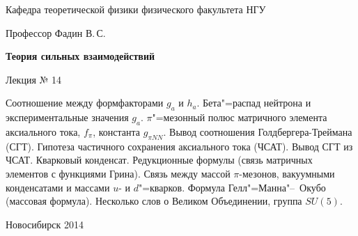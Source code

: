 \documentclass[12pt,pagesize,paper=192mm:108mm]{scrbook}
\begin{document}
\begin{titlepage}
\begin{center}
    Кафедра теоретической физики физического факультета НГУ
    \medskip

    \Large
    Профессор Фадин В.\,С.

    \huge
    \textbf{Теория сильных взаимодействий}
    \smallskip
    
    \Large
    Лекция № 14
    \vfill
    
    \normalsize
    \begin{minipage}{0.9\linewidth}
      Соотношение между формфакторами $g_a$ и $h_a$. Бета"=распад
      нейтрона и экспериментальные значения $g_a$. $\pi$"=мезонный
      полюс матричного элемента аксиального тока, $f_{\pi}$, константа
      $g_{\pi NN}$. Вывод соотношения Голдбергера-Треймана (СГТ). Гипотеза
      частичного сохранения аксиального тока (ЧСАТ). Вывод СГТ из
      ЧСАТ. Кварковый конденсат. Редукционные формулы (связь матричных
      элементов с функциями Грина). Связь между массой $\pi$-мезонов,
      вакуумными конденсатами и массами $u$- и $d$"=кварков. Формула
      Гелл"=Манна"--~Окубо (массовая формула). Несколько слов о Великом
      Объединении, группа $SU(5)$.
    \end{minipage}
    \vfill
    
    \normalsize \ccbysa\hspace{0.5em}  Новосибирск 2014   
  \end{center}
\end{titlepage}
\end{document}
